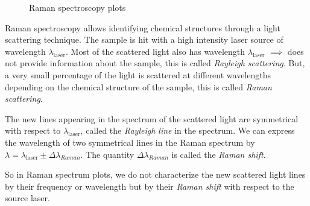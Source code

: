 \documentclass[a4paper,12pt,twoside]{article}
\begin{document}
\begin{figure}[H]
    \centering
    \caption{Raman spectroscopy plots}
\end{figure}

Raman spectroscopy allows identifying chemical structures through a light scattering technique. The sample is hit with a high intensity laser source of wavelength $\lambda_{\mathrm{laser}}$. Most of the scattered light also has wavelength $\lambda_{\mathrm{laser}}$ $\implies$ does not provide information about the sample, this is called \textit{Rayleigh scattering}. But, a very small percentage of the light is scattered at different wavelengths depending on the chemical structure of the sample, this is called \textit{Raman scattering}.

The new lines appearing in the spectrum of the scattered light are symmetrical with respect to $\lambda_{\mathrm{laser}}$\cite{raman}, called the \textit{Rayleigh line} in the spectrum. We can express the wavelength of two symmetrical lines in the Raman spectrum by $\lambda = \lambda_{\mathrm{laser}} \pm \Delta \lambda_{Raman}$. The quantity $\Delta \lambda_{Raman}$ is called the \textit{Raman shift}.

So in Raman spectrum plots, we do not characterize the new scattered light lines by their frequency or wavelength but by their \textit{Raman shift} with respect to the source laser.
\end{document}
